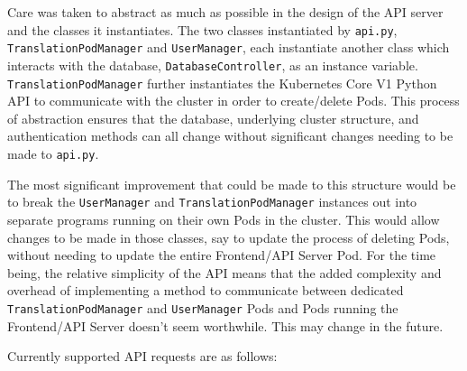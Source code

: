 \documentclass[12pt]{article}
\begin{document}
Care was taken to abstract as much as possible in the design of the
API server and the classes it instantiates.  The two classes
instantiated by \lstinline{api.py}, \lstinline{TranslationPodManager}
and \lstinline{UserManager}, each instantiate another class which
interacts with the database, \lstinline{DatabaseController}, as an
instance variable.  \lstinline{TranslationPodManager} further
instantiates the Kubernetes Core V1 Python API to communicate with the
cluster in order to create/delete Pods.  This process of abstraction
ensures that the database, underlying cluster structure, and
authentication methods can all change without significant changes
needing to be made to \lstinline{api.py}.
\par

The most significant improvement that could be made to this structure
would be to break the \lstinline{UserManager} and
\lstinline{TranslationPodManager} instances out into separate programs
running on their own Pods in the cluster.  This would allow changes to
be made in those classes, say to update the process of deleting Pods,
without needing to update the entire Frontend/API Server Pod.  For the
time being, the relative simplicity of the API means that the added
complexity and overhead of implementing a method to communicate
between dedicated \lstinline{TranslationPodManager} and
\lstinline{UserManager} Pods and Pods running the Frontend/API Server
doesn't seem worthwhile.  This may change in the future.
\par

Currently supported API requests are as follows:
\end{document}
